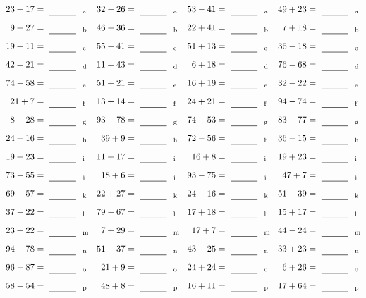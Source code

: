 \documentclass
[
  draft    = true,
  fontsize = 11pt,
  parskip  = half-
]
{scrartcl}
\begin{document}
\clearpage
\begin{align*}
    \pline{23+17}&=\rline{a}
  & \pline{32-26}&=\rline{a}
  & \pline{53-41}&=\rline{a}
  & \pline{49+23}&=\rline{a} \\[1ex]
    \pline{9+27}&=\rline{b}
  & \pline{46-36}&=\rline{b}
  & \pline{22+41}&=\rline{b}
  & \pline{7+18}&=\rline{b} \\[1ex]
    \pline{19+11}&=\rline{c}
  & \pline{55-41}&=\rline{c}
  & \pline{51+13}&=\rline{c}
  & \pline{36-18}&=\rline{c} \\[1ex]
    \pline{42+21}&=\rline{d}
  & \pline{11+43}&=\rline{d}
  & \pline{6+18}&=\rline{d}
  & \pline{76-68}&=\rline{d} \\[1ex]
    \pline{74-58}&=\rline{e}
  & \pline{51+21}&=\rline{e}
  & \pline{16+19}&=\rline{e}
  & \pline{32-22}&=\rline{e} \\[1ex]
    \pline{21+7}&=\rline{f}
  & \pline{13+14}&=\rline{f}
  & \pline{24+21}&=\rline{f}
  & \pline{94-74}&=\rline{f} \\[1ex]
    \pline{8+28}&=\rline{g}
  & \pline{93-78}&=\rline{g}
  & \pline{74-53}&=\rline{g}
  & \pline{83-77}&=\rline{g} \\[1ex]
    \pline{24+16}&=\rline{h}
  & \pline{39+9}&=\rline{h}
  & \pline{72-56}&=\rline{h}
  & \pline{36-15}&=\rline{h} \\[1ex]
    \pline{19+23}&=\rline{i}
  & \pline{11+17}&=\rline{i}
  & \pline{16+8}&=\rline{i}
  & \pline{19+23}&=\rline{i} \\[1ex]
    \pline{73-55}&=\rline{j}
  & \pline{18+6}&=\rline{j}
  & \pline{93-75}&=\rline{j}
  & \pline{47+7}&=\rline{j} \\[1ex]
    \pline{69-57}&=\rline{k}
  & \pline{22+27}&=\rline{k}
  & \pline{24-16}&=\rline{k}
  & \pline{51-39}&=\rline{k} \\[1ex]
    \pline{37-22}&=\rline{l}
  & \pline{79-67}&=\rline{l}
  & \pline{17+18}&=\rline{l}
  & \pline{15+17}&=\rline{l} \\[1ex]
    \pline{23+22}&=\rline{m}
  & \pline{7+29}&=\rline{m}
  & \pline{17+7}&=\rline{m}
  & \pline{44-24}&=\rline{m} \\[1ex]
    \pline{94-78}&=\rline{n}
  & \pline{51-37}&=\rline{n}
  & \pline{43-25}&=\rline{n}
  & \pline{33+23}&=\rline{n} \\[1ex]
    \pline{96-87}&=\rline{o}
  & \pline{21+9}&=\rline{o}
  & \pline{24+24}&=\rline{o}
  & \pline{6+26}&=\rline{o} \\[1ex]
    \pline{58-54}&=\rline{p}
  & \pline{48+8}&=\rline{p}
  & \pline{16+11}&=\rline{p}
  & \pline{17+64}&=\rline{p}
\end{align*}
\end{document}

